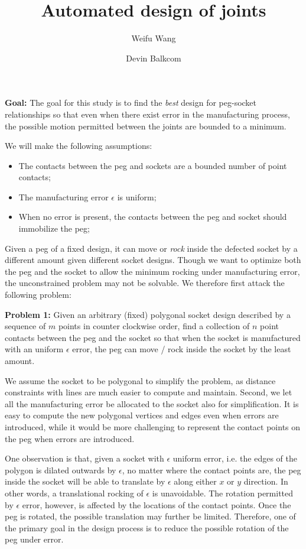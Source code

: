 \documentclass[11pt]{article}
\title{Automated design of joints}
\author{Weifu Wang \and Devin Balkcom}
\begin{document}
\maketitle


\noindent\textbf{Goal: } The goal for this study is to find the {\em best} design for peg-socket relationships so that even when there exist error in the manufacturing process, the possible motion permitted between the joints are bounded to a minimum. 

We will make the following assumptions: 
\begin{itemize}
\item The contacts between the peg and sockets are a bounded number of point contacts;
\item The manufacturing error $\epsilon$ is uniform; 
\item When no error is present, the contacts between the peg and socket should immobilize the peg; 
\end{itemize}


Given a peg of a fixed design, it can move or {\em rock} inside the defected socket by a different amount given different socket designs. Though we want to optimize both the peg and the socket to allow the minimum rocking under manufacturing error, the unconstrained problem may not be solvable. We therefore first attack the following problem: 

\noindent\textbf{Problem 1: } Given an arbitrary (fixed) polygonal socket design described by a sequence of $m$ points in counter clockwise order, find a collection of $n$ point contacts between the peg and the socket so that when the socket is manufactured with an uniform $\epsilon$ error, the peg can move / rock inside the socket by the least amount. 

We assume the socket to be polygonal to simplify the problem, as distance constraints with lines are much easier to compute and maintain. Second, we let all the manufacturing error be allocated to the socket also for simplification. It is easy to compute the new polygonal vertices and edges even when errors are introduced, while it would be more challenging to represent the contact points on the peg when errors are introduced. 

One observation is that, given a socket with $\epsilon$ uniform error, i.e. the edges of the polygon is dilated outwards by $\epsilon$, no matter where the contact points are, the peg inside the socket will be able to translate by $\epsilon$ along either $x$ or $y$ direction. In other words, a translational rocking of $\epsilon$ is unavoidable. The rotation permitted by $\epsilon$ error, however, is affected by the locations of the contact points. Once the peg is rotated, the possible translation may further be limited. Therefore, one of the primary goal in the design process is to reduce the possible rotation of the peg under error. 
\end{document}
